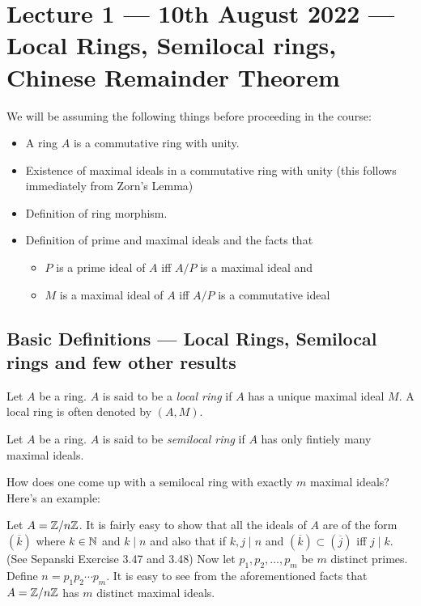 \section{Lecture 1 --- 10th August 2022 --- Local Rings, Semilocal rings, Chinese Remainder Theorem}

We will be assuming the following things before proceeding in the course:
\begin{itemize}
    \item A ring $A$ is a commutative ring with unity.
    \item Existence of maximal ideals in a commutative ring with unity (this follows immediately from Zorn's Lemma)
    \item Definition of ring morphism.
    \item Definition of prime and maximal ideals and the facts that
	\begin{itemize}
	    \item $P$ is a prime ideal of $A$ iff $A/P$ is a maximal ideal and
	    \item $M$ is a maximal ideal of $A$ iff $A/P$ is a commutative ideal
	\end{itemize}
\end{itemize}

\subsection{Basic Definitions --- Local Rings, Semilocal rings and few other results}

\begin{definition}
    Let $A$ be a ring. $A$ is said to be a \textit{local ring} if $A$ has a unique maximal ideal $M$. A local ring is often denoted by $(A,M)$. 
    \label{def:local-ring}
\end{definition}

\begin{definition}
    Let $A$ be a ring. $A$ is said to be \textit{semilocal ring} if $A$ has only fintiely many maximal ideals.
    \label{def:semilocal-ring}
\end{definition}

How does one come up with a semilocal ring with exactly $m$ maximal ideals? Here's an example:
\begin{example}
    Let $A= \mathbb Z / n\mathbb Z$. It is fairly easy to show that all the ideals of $A$ are of the form $\left( \overline k \right)$ where $k\in\mathbb N$ and $k\mid n$ and also that if $k,j \mid n$ and $\left( \overline k \right) \subset \left( \overline j \right)$ iff $j\mid k$. (See Sepanski Exercise 3.47 and 3.48) Now let $p_1 , p_2 , \ldots ,  p_m$ be $m$ distinct primes. Define $n=p_1 p_2 \cdots p_m$. It is easy to see from the aforementioned facts that $A = \mathbb Z / n\mathbb Z$ has $m $ distinct maximal ideals.
\end{example}


